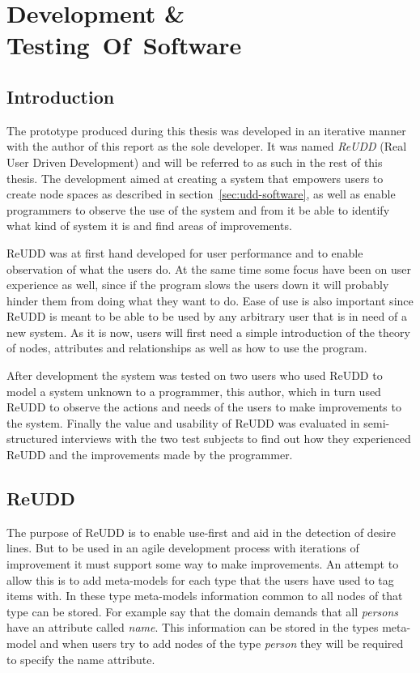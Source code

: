 \documentclass[a4paper]{report}
\begin{document}
\chapter{Development \& Testing~Of~Software} \label{chap:development-testing-of-software}

\section{Introduction}
The prototype produced during this thesis was developed in an iterative manner with the author of this report as the sole developer. It was named \emph{ReUDD} (Real User Driven Development) and will be referred to as such in the rest of this thesis. The development aimed at creating a system that empowers users to create node spaces as described in section~\ref{sec:udd-software}, as well as enable programmers to observe the use of the system and from it be able to identify what kind of system it is and find areas of improvements.

ReUDD was at first hand developed for user performance and to enable observation of what the users do. At the same time some focus have been on user experience as well, since if the program slows the users down it will probably hinder them from doing what they want to do. Ease of use is also important since ReUDD is meant to be able to be used by any arbitrary user that is in need of a new system. As it is now, users will first need a simple introduction of the theory of nodes, attributes and relationships as well as how to use the program.

After development the system was tested on two users who used ReUDD to model a system unknown to a programmer, this author, which in turn used ReUDD to observe the actions and needs of the users to make improvements to the system. Finally the value and usability of ReUDD was evaluated in semi-structured interviews with the two test subjects to find out how they experienced ReUDD and the improvements made by the programmer.

\section{ReUDD}
The purpose of ReUDD is to enable use-first and aid in the detection of desire lines. But to be used in an agile development process with iterations of improvement it must support some way to make improvements. An attempt to allow this is to add meta-models for each type that the users have used to tag items with. In these type meta-models information common to all nodes of that type can be stored. For example say that the domain demands that all \emph{persons} have an attribute called \emph{name}. This information can be stored in the types meta-model and when users try to add nodes of the type \emph{person} they will be required to specify the name attribute.
\end{document}
